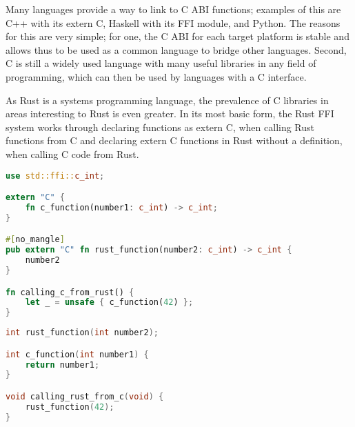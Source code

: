 Many languages provide a way to link to C ABI functions; examples of this are C++ with its extern C, Haskell with its FFI module, and Python.
The reasons for this are very simple; for one, the C ABI for each target platform is stable and allows thus to be used as a common language to bridge other languages.
Second, C is still a widely used language with many useful libraries in any field of programming, which can then be used by languages with a C interface.

As Rust is a systems programming language, the prevalence of C libraries in areas interesting to Rust is even greater.
In its most basic form, the Rust FFI system works through declaring functions as extern C, when calling Rust functions from C
and declaring extern C functions in Rust without a definition, when calling C code from Rust.

\begin{lstlisting}[language=Rust,style=colouredRust]
use std::ffi::c_int;

extern "C" {
    fn c_function(number1: c_int) -> c_int;
}

#[no_mangle]
pub extern "C" fn rust_function(number2: c_int) -> c_int {
    number2
}

fn calling_c_from_rust() {
    let _ = unsafe { c_function(42) };
}
\end{lstlisting}

\begin{lstlisting}[language=C]
int rust_function(int number2);

int c_function(int number1) {
    return number1;
}

void calling_rust_from_c(void) {
    rust_function(42);
}
\end{lstlisting}

